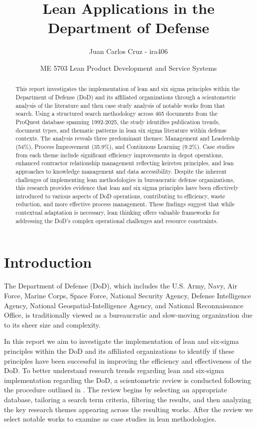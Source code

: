 \documentclass{article}
\title{Lean Applications in the Department of Defense}
\author{Juan Carlos Cruz - ira406}
\date{ME 5703 Lean Product Development and Service Systems}
\begin{document}
	\maketitle
	\noindent%

	\begin{abstract}
		This report investigates the implementation of lean and six sigma principles within the Department of Defense (DoD) and its affiliated organizations through a scientometric analysis of the literature and then case study analysis of notable works from that search.
		Using a structured search methodology across 465 documents from the ProQuest database spanning 1992-2025, the study identifies publication trends, document types, and thematic patterns in lean six sigma literature within defense contexts. 
		The analysis reveals three predominant themes: Management and Leadership (54\%), Process Improvement (35.9\%), and Continuous Learning (9.2\%).
		Case studies from each theme include significant efficiency improvements in depot operations, enhanced contractor relationship management reflecting keiretsu principles, and lean approaches to knowledge management and data accessibility. 
		Despite the inherent challenges of implementing lean methodologies in bureaucratic defense organizations, this research provides evidence that lean and six sigma principles have been effectively introduced to various aspects of DoD operations, contributing to efficiency, waste reduction, and more effective process management. 
		These findings suggest that while contextual adaptation is necessary, lean thinking offers valuable frameworks for addressing the DoD's complex operational challenges and resource constraints.
	\end{abstract}

	\section{Introduction}

		The Department of Defense (DoD), which includes the U.S. Army, Navy, Air Force, Marine Corps, Space Force, National Security Agency, Defense Intelligence Agency, National Geospatial-Intelligence Agency, and National Reconnaissance Office, is traditionally viewed as a bureaucratic and slow-moving organization due to its sheer size and complexity.

		In this report we aim to investigate the implementation of lean and six-sigma principles within the DoD and its affiliated organizations to identify if these principles have been successful in improving the efficiency and effectiveness of the DoD.
		To better understand research trends regarding lean and six-sigma implementation regarding the DoD, a scientometric review is conducted following the procedure outlined in \cite{MA2023104828}.
		The review begins by selecting an appropriate database, tailoring a search term criteria, filtering the results, and then analyzing the key research themes appearing across the resulting works.
		After the review we select notable works to examine as case studies in lean methodologies. 
\end{document}
